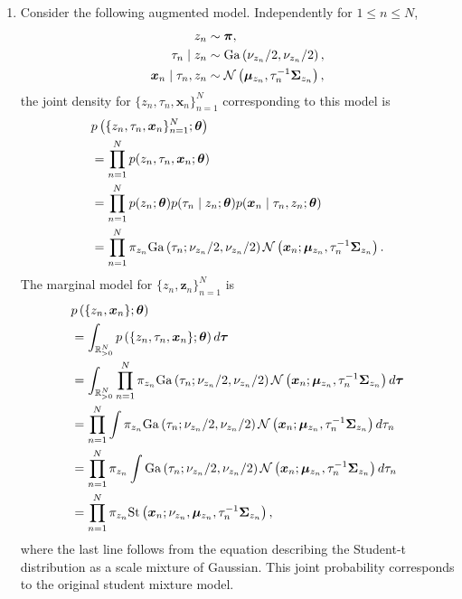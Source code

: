 \begin{enumerate}[label = (\alph*)]
    \item Consider the following augmented model. Independently for $1 \le n \le N$,
    \begin{align*}
        z_n &\sim \bm{\pi}, \\
        \tau_n\mid z_n &\sim \mathrm{Ga}\left(\nu_{z_n}/2,\nu_{z_n}/2 \right), \\
        \bm{x}_n \mid \tau_n,z_n &\sim {\mathcal N}\left(\bm{\mu}_{z_n}, \tau_n^{-1}\bm{\Sigma}_{z_n}\right), 
    \end{align*}
    the joint density for $\{z_n,\tau_n,\bm{x}_n\}_{n=1}^N$ corresponding to this model is
    \begin{align*}
        &p\left(\{z_n,\tau_n,\bm{x}_n\}_{n=1}^N;\bm{\theta}\right)\\
        &=\prod_{n=1}^N p(z_n,\tau_n,\bm{x}_n;\bm{\theta})\\
        &=\prod_{n=1}^N p(z_n;\bm{\theta})p(\tau_n\mid z_n;\bm{\theta})p(\bm{x}_n\mid \tau_n,z_n;\bm{\theta}) \\
        &=\prod_{n=1}^N \pi_{z_n}\mathrm{Ga}\left(\tau_n; \nu_{z_n}/2, \nu_{z_n}/2\right){\mathcal N}\left(\bm{x}_n; \bm{\mu}_{z_n}, \tau_{n}^{-1}\bm{\Sigma}_{z_n}\right).
    \end{align*}
    The marginal model for $\{z_n,\bm{z}_n\}_{n=1}^N$ is
    \begin{align*}
        &p\left(\{z_n,\bm{x}_n\};\bm{\theta}\right)\\
        &=\int_{\mathbb{R}_{> 0}^N} p\left(\{z_n,\tau_n,\bm{x}_n\};\bm{\theta}\right)d\bm{\tau}\\
        &=\int_{\mathbb{R}_{> 0}^N} \prod_{n=1}^N \pi_{z_n}\mathrm{Ga}\left(\tau_n; \nu_{z_n}/2, \nu_{z_n}/2\right){\mathcal N}\left(\bm{x}_n; \bm{\mu}_{z_n}, \tau_{n}^{-1}\bm{\Sigma}_{z_n}\right)d\bm{\tau}\\
        &=\prod_{n=1}^N \int  \pi_{z_n}\mathrm{Ga}\left(\tau_n; \nu_{z_n}/2, \nu_{z_n}/2\right){\mathcal N}\left(\bm{x}_n; \bm{\mu}_{z_n}, \tau_{n}^{-1}\bm{\Sigma}_{z_n}\right)d\tau_n \\
        &=\prod_{n=1}^N \pi_{z_n}\int  \mathrm{Ga}\left(\tau_n; \nu_{z_n}/2, \nu_{z_n}/2\right){\mathcal N}\left(\bm{x}_n; \bm{\mu}_{z_n}, \tau_{n}^{-1}\bm{\Sigma}_{z_n}\right)d\tau_n\\
        &=\prod_{n=1}^N \pi_{z_n}\mathrm{St}\left(\bm{x}_n; \nu_{z_n}, \bm{\mu}_{z_n}, \tau_{n}^{-1}\bm{\Sigma}_{z_n}\right),
    \end{align*}
    where the last line follows from the equation describing the Student-t distribution as a scale mixture of Gaussian. This joint probability corresponds to the original student mixture model.

\end{enumerate}
